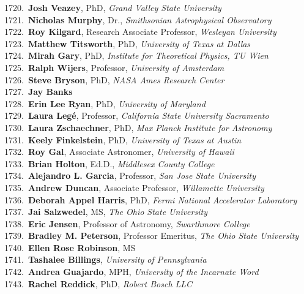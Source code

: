 1720.~{\bf Josh Veazey}, PhD, {\sl Grand Valley State University} \\
1721.~{\bf Nicholas Murphy}, Dr., {\sl Smithsonian Astrophysical Observatory} \\
1722.~{\bf Roy Kilgard}, Research Associate Professor, {\sl Wesleyan University} \\
1723.~{\bf Matthew Titsworth}, PhD, {\sl University of Texas at Dallas} \\
1724.~{\bf Mirah Gary}, PhD, {\sl Institute for Theoretical Physics, TU Wien} \\
1725.~{\bf Ralph Wijers}, Professor, {\sl University of Amsterdam} \\
1726.~{\bf Steve Bryson}, PhD, {\sl NASA Ames Research Center} \\
1727.~{\bf Jay Banks} \\
1728.~{\bf Erin Lee Ryan}, PhD, {\sl University of Maryland} \\
1729.~{\bf Laura Leg\'{e}}, Professor, {\sl California State University Sacramento } \\
1730.~{\bf Laura Zschaechner}, PhD, {\sl Max Planck Institute for Astronomy} \\
1731.~{\bf Keely Finkelstein}, PhD, {\sl University of Texas at Austin} \\
1732.~{\bf Roy Gal}, Associate Astronomer, {\sl University of Hawaii} \\
1733.~{\bf Brian Holton}, Ed.D., {\sl Middlesex County College} \\
1734.~{\bf Alejandro L. Garcia}, Professor, {\sl San Jose State University} \\
1735.~{\bf Andrew Duncan}, Associate Professor, {\sl Willamette University} \\
1736.~{\bf Deborah Appel Harris}, PhD, {\sl Fermi National Accelerator Laboratory} \\
1737.~{\bf Jai Salzwedel}, MS, {\sl The Ohio State University} \\
1738.~{\bf Eric Jensen}, Professor of Astronomy, {\sl Swarthmore College} \\
1739.~{\bf Bradley M. Peterson}, Professor Emeritus, {\sl The Ohio State University} \\
1740.~{\bf Ellen Rose Robinson}, MS \\
1741.~{\bf Tashalee Billings}, {\sl University of Pennsylvania } \\
1742.~{\bf Andrea Guajardo}, MPH, {\sl University of the Incarnate Word} \\
1743.~{\bf Rachel Reddick}, PhD, {\sl Robert Bosch LLC} \\
